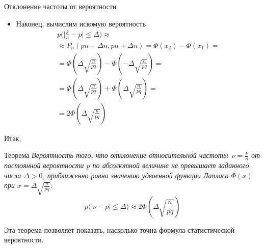 \documentclass[unicode,11pt,notheorems,xcolor=table]{beamer}
\begin{document}
\begin{frame}[allowframebreaks]{Отклонение частоты от вероятности}{}
\begin{itemize}
         \item Наконец, вычислим искомую вероятность
         \begin{multline*}
            p\Big( \big|\tfrac{k}{n} - p \big| \leqslant \Delta \Big)
            \approx\\
            \approx P_n(pn-\Delta n, pn+\Delta n) 
            = \Phi(x_2)-\Phi(x_1) 
            =\\
            = \Phi\left(\Delta \sqrt{\frac{n}{pq}}\right)-\Phi\left(-\Delta \sqrt{\frac{n}{pq}}\right)
            =\\
            = \Phi\left(\Delta \sqrt{\frac{n}{pq}}\right)+\Phi\left(\Delta \sqrt{\frac{n}{pq}}\right)
            =\\
            = 2\Phi\left(\Delta \sqrt{\frac{n}{pq}}\right)
        \end{multline*}
    \end{itemize}
    Итак, 
    \begin{block}{Теорема}
        \itshape
        Вероятность того, что отклонение относительной частоты~$\nu=\frac{k}{n}$ от постоянной вероятности $p$ по абсолютной величине не превышает заданного числа $\Delta>0$, приближенно равна значению удвоенной функции Лапласа $\Phi(x)$ при $x= \Delta \sqrt{\frac{n}{pq}}$:
        $$
        p\Big( \big|\nu - p \big| \leqslant \Delta \Big) \approx 2\Phi\left(\Delta \sqrt{\frac{n}{pq}}\right)
        $$
    \end{block}

    \bigskip
    Эта теорема позволяет показать, насколько точна формула статистической вероятности.
\end{frame}
\end{document}

